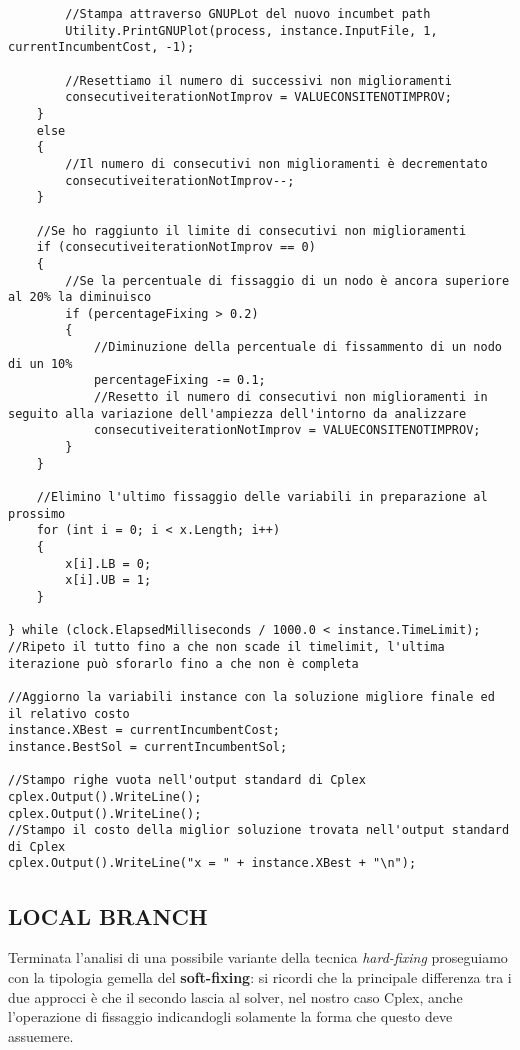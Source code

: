 \documentclass[11pt]{article}
\begin{document}
\begin{lstlisting}
        //Stampa attraverso GNUPLot del nuovo incumbet path
        Utility.PrintGNUPlot(process, instance.InputFile, 1, currentIncumbentCost, -1);

        //Resettiamo il numero di successivi non miglioramenti
        consecutiveiterationNotImprov = VALUECONSITENOTIMPROV;
    }
    else
    {
        //Il numero di consecutivi non miglioramenti è decrementato
        consecutiveiterationNotImprov--;
    }

    //Se ho raggiunto il limite di consecutivi non miglioramenti
    if (consecutiveiterationNotImprov == 0)
    {
        //Se la percentuale di fissaggio di un nodo è ancora superiore al 20% la diminuisco
        if (percentageFixing > 0.2)
        {
            //Diminuzione della percentuale di fissammento di un nodo di un 10%
            percentageFixing -= 0.1;
            //Resetto il numero di consecutivi non miglioramenti in seguito alla variazione dell'ampiezza dell'intorno da analizzare
            consecutiveiterationNotImprov = VALUECONSITENOTIMPROV;
        }
    }

    //Elimino l'ultimo fissaggio delle variabili in preparazione al prossimo 
    for (int i = 0; i < x.Length; i++)
    {
        x[i].LB = 0;
        x[i].UB = 1;
    }

} while (clock.ElapsedMilliseconds / 1000.0 < instance.TimeLimit);
//Ripeto il tutto fino a che non scade il timelimit, l'ultima iterazione può sforarlo fino a che non è completa

//Aggiorno la variabili instance con la soluzione migliore finale ed il relativo costo
instance.XBest = currentIncumbentCost;
instance.BestSol = currentIncumbentSol;

//Stampo righe vuota nell'output standard di Cplex
cplex.Output().WriteLine();
cplex.Output().WriteLine();
//Stampo il costo della miglior soluzione trovata nell'output standard di Cplex
cplex.Output().WriteLine("x = " + instance.XBest + "\n");
\end{lstlisting}

\subsection*{LOCAL BRANCH}

Terminata l'analisi di una possibile variante della tecnica \textit{hard-fixing} proseguiamo con la tipologia gemella del \textbf{soft-fixing}: si ricordi che la principale differenza tra i due approcci è che il secondo lascia al solver, nel nostro caso Cplex, anche l'operazione di fissaggio indicandogli solamente la forma che questo deve assuemere.
\end{document}

